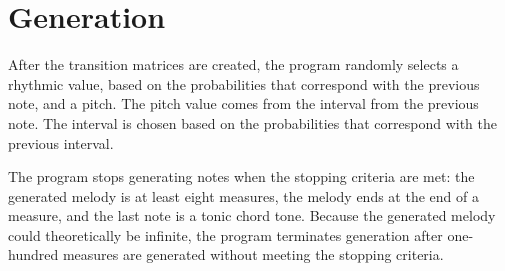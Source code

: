 \section{Generation}

After the transition matrices are created, the program randomly selects a rhythmic value, based on the probabilities that correspond with the previous note, and a pitch.
The pitch value comes from the interval from the previous note.
The interval is chosen based on the probabilities that correspond with the previous interval.

The program stops generating notes when the stopping criteria are met: the generated melody is at least eight measures, the melody ends at the end of a measure, and the last note is a tonic chord tone.
Because the generated melody could theoretically be infinite, the program terminates generation after one-hundred measures are generated without meeting the stopping criteria.
